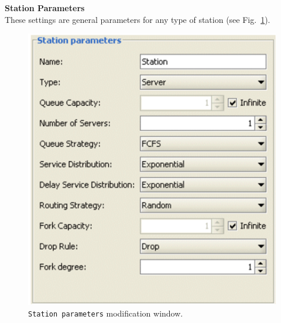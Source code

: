 \noindent \textbf{Station Parameters}\\
These settings are general parameters for any type of station (see
Fig.~\ref{fig:stparam}).
\begin{figure}[htb]
    \begin{center}
        \includegraphics[scale=.5]{img/jsimg/9.3.eps}
    \end{center}
    \caption{\texttt{Station parameters} modification window.}
    \label{fig:stparam}
\end{figure}
